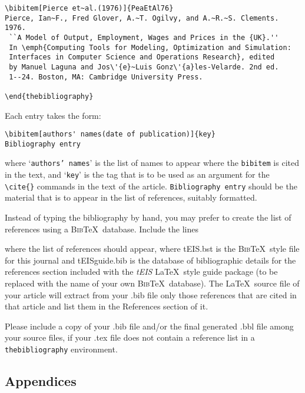 \documentclass[]{tEIS2e}
\theoremstyle{plain}
\theoremstyle{remark}
\begin{document}
\begin{verbatim}
\bibitem[Pierce et~al.(1976)]{PeaEtAl76}
Pierce, Ian~F., Fred Glover, A.~T. Ogilvy, and A.~R.~S. Clements. 1976.
 ``A Model of Output, Employment, Wages and Prices in the {UK}.''
 In \emph{Computing Tools for Modeling, Optimization and Simulation:
 Interfaces in Computer Science and Operations Research}, edited
 by Manuel Laguna and Jos\'{e}~Luis Gonz\'{a}les-Velarde. 2nd ed.
 1--24. Boston, MA: Cambridge University Press.

\end{thebibliography}
\end{verbatim}
\medskip
\noindent Each entry takes the form:
\medskip
\begin{verbatim}
\bibitem[authors' names(date of publication)]{key}
Bibliography entry
\end{verbatim}
\medskip
\noindent where `\texttt{authors' names}' is the list of names to appear where the \verb"bibitem" is cited in the text, and `{\tt key}' is the tag that is to be used as an argument for the \verb"\cite{}" commands in the text of the article. {\tt Bibliography entry} should be the material that is to appear in the list of references, suitably formatted.

Instead of typing the bibliography by hand, you may prefer to create the list of references using a \textsc{Bib}\TeX\ database. Include the lines \vspace{12pt}

\noindent\verb""
\newline\verb""
\vspace{12pt}

\noindent where the list of references should appear, where tEIS.bst is the \textsc{Bib}\TeX\ style file for this journal and tEISguide.bib is the database of bibliographic details for the references section included with the {\itshape tEIS} \LaTeX\ style guide package (to be replaced with the name of your own \textsc{Bib}\TeX\ database). The \LaTeX\ source file of your article will extract from your .bib file only those references that are cited in that article and list them in the References section of it.

Please include a copy of your .bib file and/or the final generated .bbl file among your source files, if your .tex file does not contain a reference list in a {\tt{thebibliography}} environment.


\subsection{Appendices}\label{appendices}
\end{document}
